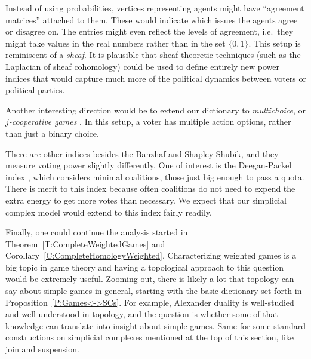 \documentclass[11pt]{amsart}
\newcommand{\ffn}[1]{\footnote{{\bf Franjo: }#1}}
\theoremstyle{plain}
\theoremstyle{definition}
\theoremstyle{remark}
\newcommand{\refT}[1]{Theorem~\ref{T:#1}}
\newcommand{\refC}[1]{Corollary~\ref{C:#1}}
\newcommand{\refP}[1]{Proposition~\ref{P:#1}}
\begin{document}


Instead of using probabilities, vertices representing agents might have ``agreement matrices'' attached to them. These would indicate which issues the agents agree or disagree on. The entries might even reflect the levels of agreement, i.e.~they might take values in the real numbers rather than in the set $\{0,1\}$. This setup is reminiscent of a \emph{sheaf}. It is plausible that sheaf-theoretic techniques (such as the Laplacian of sheaf cohomology) could be used to define entirely new power indices that would capture much more of the political dynamics between voters or political parties.


Another interesting direction would be to extend our dictionary to \emph{multichoice}, or \emph{$j$-cooperative games} \cite{F:BanzhafMultichoice, FZ:WeightedMultichoice}. In this setup, a voter has multiple action options, rather than just a binary choice.


There are other indices besides the Banzhaf and Shapley-Shubik, and they measure voting power slightly differently. One of interest is the Deegan-Packel index \cite{DP78}, which considers minimal coalitions, those just big enough to pass a quota. There is merit to this index because often coalitions do not need to expend the extra energy to get more votes than necessary. We expect that our simplicial complex model would extend to this index fairly readily. 

Finally, one could continue the analysis started in \refT{CompleteWeightedGames} and \refC{CompleteHomologyWeighted}. Characterizing weighted games is a big topic in game theory and having a topological approach to this question would be extremely useful. Zooming out, there is likely a lot that topology can say about simple games in general, starting with the basic dictionary set forth in \refP{Games<->SCs}. For example, Alexander duality is well-studied and well-understood in topology, and the question is whether some of that knowledge can translate into insight about simple games. Same for some standard constructions on simplicial complexes mentioned at the top of this section, like join and suspension.
\end{document}
